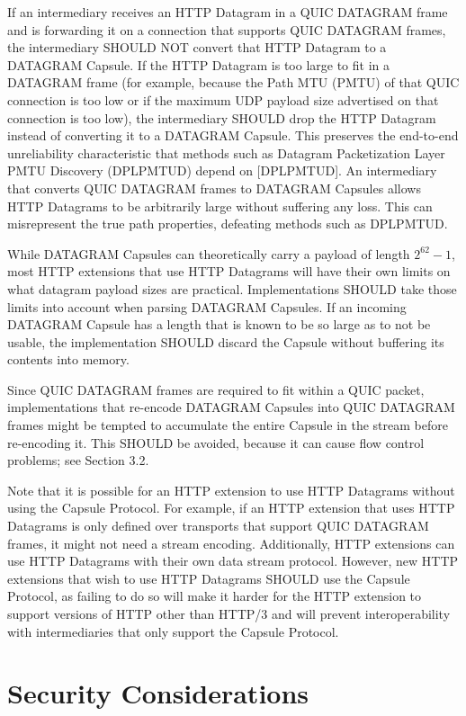 \documentclass{article}
\begin{document}
If an intermediary receives an HTTP Datagram in a QUIC DATAGRAM frame
and is forwarding it on a connection that supports QUIC DATAGRAM
frames, the intermediary SHOULD NOT convert that HTTP Datagram to a
DATAGRAM Capsule.  If the HTTP Datagram is too large to fit in a
DATAGRAM frame (for example, because the Path MTU (PMTU) of that QUIC
connection is too low or if the maximum UDP payload size advertised
on that connection is too low), the intermediary SHOULD drop the HTTP
Datagram instead of converting it to a DATAGRAM Capsule.  This
preserves the end-to-end unreliability characteristic that methods
such as Datagram Packetization Layer PMTU Discovery (DPLPMTUD) depend
on [DPLPMTUD].  An intermediary that converts QUIC DATAGRAM frames to
DATAGRAM Capsules allows HTTP Datagrams to be arbitrarily large
without suffering any loss.  This can misrepresent the true path
properties, defeating methods such as DPLPMTUD.

While DATAGRAM Capsules can theoretically carry a payload of length
$2^{62}-1$, most HTTP extensions that use HTTP Datagrams will have their
own limits on what datagram payload sizes are practical.
Implementations SHOULD take those limits into account when parsing
DATAGRAM Capsules.  If an incoming DATAGRAM Capsule has a length that
is known to be so large as to not be usable, the implementation
SHOULD discard the Capsule without buffering its contents into
memory.

Since QUIC DATAGRAM frames are required to fit within a QUIC packet,
implementations that re-encode DATAGRAM Capsules into QUIC DATAGRAM
frames might be tempted to accumulate the entire Capsule in the
stream before re-encoding it.  This SHOULD be avoided, because it can
cause flow control problems; see Section 3.2.

Note that it is possible for an HTTP extension to use HTTP Datagrams
without using the Capsule Protocol.  For example, if an HTTP
extension that uses HTTP Datagrams is only defined over transports
that support QUIC DATAGRAM frames, it might not need a stream
encoding.  Additionally, HTTP extensions can use HTTP Datagrams with
their own data stream protocol.  However, new HTTP extensions that
wish to use HTTP Datagrams SHOULD use the Capsule Protocol, as
failing to do so will make it harder for the HTTP extension to
support versions of HTTP other than HTTP/3 and will prevent
interoperability with intermediaries that only support the Capsule
Protocol.

\section{Security Considerations}
\end{document}
